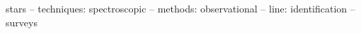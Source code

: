 \documentclass[twocolumn,apj,numberedappendix,appendixfloats]{openjournal}
\begin{document}


\begin{keywords}
    {stars -- techniques: spectroscopic -- methods: observational -- line: identification -- surveys}
\end{keywords}

\maketitle
\end{document}
